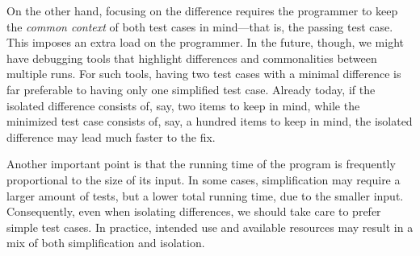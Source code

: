 \documentclass{acm_proc_article-sp}
\theoremstyle{plain}
\begin{document}
On the other hand, focusing on the difference requires the programmer
to keep the \emph{common context} of both test cases in mind---that
is, the passing test case.  This imposes an extra load on the
programmer.  In the future, though, we might have debugging tools that
highlight differences and commonalities between multiple runs.  For
such tools, having two test cases with a minimal difference is far
preferable to having only one simplified test case.  Already today, if
the isolated difference consists of, say, two items to keep in mind,
while the minimized test case consists of, say, a hundred items to
keep in mind, the isolated difference may lead much faster to the fix.

Another important point is that the running time of the program is
frequently proportional to the size of its input.  In some cases,
simplification may require a larger amount of tests, but a lower total
running time, due to the smaller input.  Consequently, even when
isolating differences, we should take care to prefer simple test
cases.  In practice, intended use and available resources may result
in a mix of both simplification and isolation.
\end{document}
